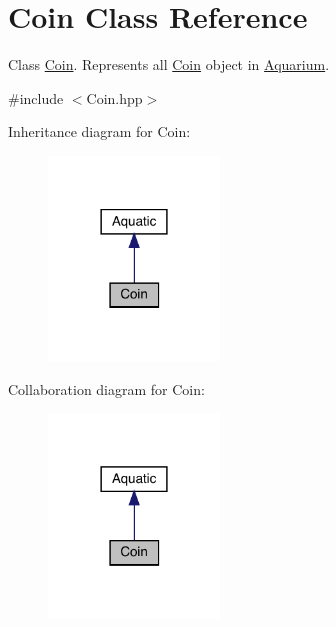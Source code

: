 \hypertarget{class_coin}{}\section{Coin Class Reference}
\label{class_coin}


Class \mbox{\hyperlink{class_coin}{Coin}}. Represents all \mbox{\hyperlink{class_coin}{Coin}} object in \mbox{\hyperlink{class_aquarium}{Aquarium}}.  




{\ttfamily \#include $<$Coin.\+hpp$>$}



Inheritance diagram for Coin\+:\nopagebreak
\begin{figure}[H]
\begin{center}
\leavevmode
\includegraphics[width=129pt]{class_coin__inherit__graph}
\end{center}
\end{figure}


Collaboration diagram for Coin\+:\nopagebreak
\begin{figure}[H]
\begin{center}
\leavevmode
\includegraphics[width=129pt]{class_coin__coll__graph}
\end{center}
\end{figure}
